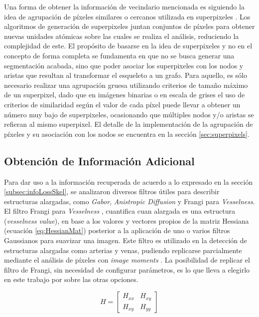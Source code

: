 Una forma de obtener la informaci\'on de vecindario mencionada es siguiendo la idea de agrupaci\'on de p\'ixeles similares o cercanos utilizada en superpixeles \citep{achanta2012slic}. Los algoritmos de generaci\'on de superpixeles juntan conjuntos de p\'ixeles para obtener nuevas unidades at\'omicas sobre las cuales se realiza el an\'alisis, reduciendo la complejidad de este. El prop\'osito de basarse en la idea de superpixeles y no en el concepto de forma completa se fundamenta en que no se busca generar una segmentaci\'on acabada, sino que poder asociar los superpixeles con los nodos y aristas que resultan al transformar el esqueleto a un grafo. Para aquello, es s\'olo necesario realizar una agrupaci\'on gruesa utilizando criterios de tama\~no m\'aximo de un superpixel, dado que en im\'agenes binarias o en escala de grises el uso de criterios de similaridad seg\'un el valor de cada p\'ixel puede llevar a obtener un n\'umero muy bajo de superpixeles, ocasionando que m\'ultiples nodos y/o aristas se refieran al mismo superpixel. El detalle de la implementaci\'on de la agrupaci\'on de p\'ixeles y su asociaci\'on con los nodos se encuentra en la secci\'on \ref{sec:superpixels}.


\subsection{Obtenci\'on de Informaci\'on Adicional}

Para dar uso a la informaci\'on recuperada de acuerdo a lo expresado en la secci\'on \ref{subsec:infoLossSkel}, se analizaron diversos filtros \'utiles para describir estructuras alargadas, como {\it Gabor}, {\it Anistropic Diffusion} y Frangi para {\it Vesselness}. El filtro Frangi para {\it Vesselness} \citep{frangi1998multiscale, fu2018frangi}, cuantifica cuan alargada es una estructura ({\it vesselness value}), en base a los valores y vectores propios de la matriz Hessiana (ecuaci\'on \ref{eq:HessianMat}) posterior a la aplicaci\'on de uno o varios filtros Gaussianos para suavizar una imagen. Este filtro es utilizado en la detecci\'on de estructuras alargadas como arterias y venas, pudiendo replicarse parcialmente mediante el an\'alisis de p\'ixeles con {\it image moments} \citep{flusser2009moments}. La posibilidad de replicar el filtro de Frangi, sin necesidad de configurar par\'ametros, es lo que lleva a elegirlo en este trabajo por sobre las otras opciones.

\begin{equation}
    \label{eq:HessianMat}
    H = \begin{bmatrix}
        H_{xx} & H_{xy} \\
        H_{xy} & H_{yy} 
        \end{bmatrix}
\end{equation}

